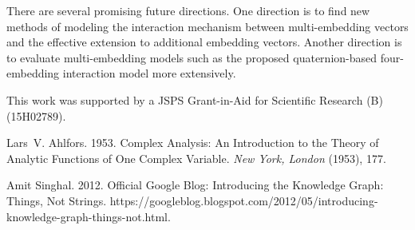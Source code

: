 \documentclass[sigconf,edbt]{acmart-edbt2019}
\begin{document}
There are several promising future directions. One direction is to find new methods of modeling the interaction mechanism between multi-embedding vectors and the effective extension to additional embedding vectors. Another direction is to evaluate multi-embedding models such as the proposed quaternion-based four-embedding interaction model more extensively.

\begin{acks}
This work was supported by a JSPS Grant-in-Aid for Scientific Research (B) (15H02789).
\end{acks}




\begin{thebibliography}{36}



\ifx \showCODEN    \undefined {}     \fi
\ifx \showDOI      \undefined \def \showDOI       #1{#1}\fi
\ifx \showISBNx    \undefined \def \showISBNx     #1{\unskip}     \fi
\ifx \showISBNxiii \undefined \def \showISBNxiii  #1{\unskip}     \fi
\ifx \showISSN     \undefined \def \showISSN      #1{\unskip}     \fi
\ifx \showLCCN     \undefined \def \showLCCN      #1{\unskip}     \fi
\ifx \shownote     \undefined \def \shownote      #1{#1}          \fi
\ifx \showarticletitle \undefined \def \showarticletitle #1{#1}   \fi
\ifx \showURL      \undefined \def \showURL       {\relax}        \fi
\providecommand\bibfield[2]{#2}
\providecommand\bibinfo[2]{#2}
\providecommand\natexlab[1]{#1}
\providecommand\showeprint[2][]{arXiv:#2}

\bibfield{author}{\bibinfo{person}{Lars~V. Ahlfors}.}
  \bibinfo{year}{1953}\natexlab{}.
\newblock \showarticletitle{Complex Analysis: An Introduction to the Theory of
  Analytic Functions of One Complex Variable}.
\newblock \bibinfo{journal}{\emph{New York, London}} (\bibinfo{year}{1953}),
  \bibinfo{pages}{177}.
\newblock


\bibfield{author}{\bibinfo{person}{{Amit Singhal}}.}
  \bibinfo{year}{2012}\natexlab{}.
\newblock \bibinfo{title}{Official {{Google Blog}}: {{Introducing}} the
  {{Knowledge Graph}}: Things, Not Strings}.
\newblock
  \bibinfo{howpublished}{https://googleblog.blogspot.com/2012/05/introducing-knowledge-graph-things-not.html}.
\newblock



\end{thebibliography}
\end{document}
